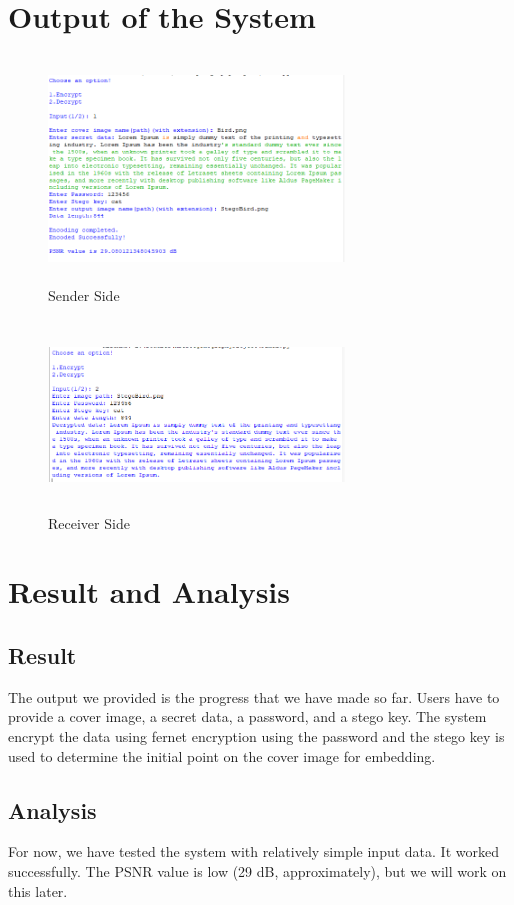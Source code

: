 \documentclass{report}
\begin{document}
\newpage
\section{Output of the System}
\begin{figure}[htbp]
  \centering
  \includegraphics[width=0.7\textwidth, height=6cm]{Screenshot (360).png} 
  \caption{Sender Side }
  \label{fig:7}
\end{figure}

\begin{figure}[htbp]
  \centering
  \includegraphics[width=0.7\textwidth, height=5cm]{Screenshot (361).png} 
  \caption{Receiver Side }
  \label{fig:8}
\end{figure}

\section{Result and Analysis}
\subsection{Result}
The output we provided is the progress that we have made so far. Users have to provide a cover image, a secret data, a password, and a stego key. The system encrypt the data using fernet encryption using the password and the stego key is used to determine the initial point on the cover image for embedding.

\subsection{Analysis}
For now, we have tested the system with relatively simple input data. It worked successfully. The PSNR value is low (29 dB, approximately), but we will work on this later.
\end{document}
